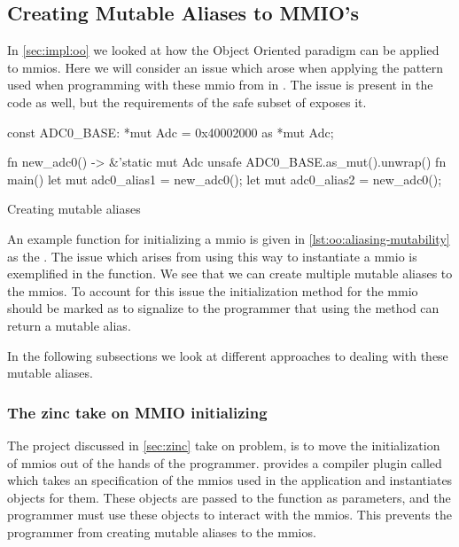 \subsection{Creating Mutable Aliases to MMIO's}
\label{sec:res:aliasing-mmios}

In \autoref{sec:impl:oo} we looked at how the Object Oriented paradigm can be applied to \glspl{mmio}.
Here we will consider an issue which arose when applying the pattern used when programming with these \gls{mmio} from {\C} in {\rust}.
The issue is present in the {\C} code as well, but the requirements of the safe subset of {\rust} exposes it.

\begin{listing}[H]
  \begin{rustcode}
const ADC0_BASE: *mut Adc = 0x40002000 as *mut Adc;

fn new_adc0() -> &'static mut Adc {
  unsafe { ADC0_BASE.as_mut().unwrap() }
}
fn main() {
  let mut adc0_alias1 = new_adc0();
  let mut adc0_alias2 = new_adc0();
}
  \end{rustcode}
  \caption{Creating mutable aliases}
  \label{lst:oo:aliasing-mutability}
\end{listing}

An example function for initializing a \gls{mmio} is given in \autoref{lst:oo:aliasing-mutability} as the .
The issue which arises from using this way to instantiate a \gls{mmio} is exemplified in the {\main} function.
We see that we can create multiple mutable aliases to the \glspl{mmio}.
To account for this issue the initialization method for the \gls{mmio} should be marked as {\unsafe} to signalize to the programmer that using the method can return a mutable alias.

In the following subsections we look at different approaches to dealing with these mutable aliases.

\subsubsection{The zinc take on MMIO initializing}

The  project discussed in \autoref{sec:zinc} take on problem, is to move the initialization of \glspl{mmio} out of the hands of the programmer.
 provides a compiler plugin called  which takes an specification of the \glspl{mmio} used in the application and instantiates objects for them.
These objects are passed to the {\main} function as parameters, and the programmer must use these objects to interact with the \glspl{mmio}.
This prevents the programmer from creating mutable aliases to the \glspl{mmio}.

